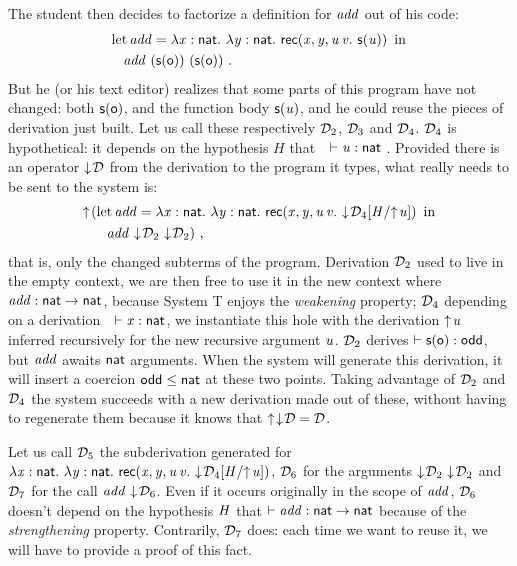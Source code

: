 \documentclass[9pt]{sigplanconf}
\begin{document}
The student then decides to factorize a definition for $\var{add}$ out
of his code:
\begin{align*}
  &\letb{add}{\tlam x {\cst{nat}} \tlam y {\cst{nat}} \recb {\var x}
    {\var y} u v {\s{\var u}}}
  \\
  &\quad\app{\var{add}}\app{(\s\z)}{(\s\z)} \ \text{.}
\end{align*}
But he (or his text editor) realizes that some parts of this program
have not changed: both $\s\z$, and the function body $\s{\var u}$, and
he could reuse the pieces of derivation just built. Let us call these
respectively $\md_2$, $\md_3$ and $\md_4$. $\md_4$ is hypothetical: it
depends on the hypothesis $H$ that\ \ $\vdash \var u:\cst{nat}$ .
Provided there is an operator $\fget\md$ from the derivation to the
program it types, what really needs to be sent to the system is:
\begin{align*}
  &\finfer{}(
    \letb{add}{\tlam x {\cst{nat}} \tlam y {\cst{nat}} \recb {\var x}
      {\var y} u v {\fget{\gsubst{\md_4}{\msubst{H}{\finfer{\var u}}}}}}
    \\&\qquad
    \app{\var{add}}\app{\fget{\md_2}}{\fget{\md_2}}
  )
\ \text{,}
\end{align*}
that is, only the changed subterms of the program. Derivation $\md_2$
used to live in the empty context, we are then free to use it in the
new context where $\var{add}:\cst{nat}\to\cst{nat}$, because System
\sysname T enjoys the \emph{weakening} property; $\md_4$ depending on
a derivation\ \ $\vdash\var x:\cst{nat}$, we instantiate this hole
with the derivation $\finfer{\var u}$ inferred recursively for the new
recursive argument $\var u$. $\md_2$ derives $\vdash \s\z :
\cst{odd}$, but $\var{add}$ awaits $\cst{nat}$ arguments. When the
system will generate this derivation, it will insert a coercion
$\cst{odd} \leq \cst{nat}$ at these two points. Taking advantage of
$\md_2$ and $\md_4$ the system succeeds with a new derivation made out
of these, without having to regenerate them because it knows that
$\finfer{\fget\md} = \md$.

Let us call $\md_5$ the subderivation generated for $\tlam x
{\cst{nat}} \tlam y {\cst{nat}} \recb {\var x} {\var y} u v
{\fget{\gsubst{\md_4}{\msubst H {\finfer{\var u}}}}}$, $\md_6$ for the
arguments $\app{\fget{\md_2}}{\fget{\md_2}}$ and $\md_7$ for the call
$\app{\var{add}} {\fget{\md_6}}$. Even if it occurs originally in the
scope of $\var{add}$, $\md_6$ doesn't depend on the hypothesis $\var
H$ that $\vdash \var{add}:\cst{nat}\to\cst{nat}$ because of the
\emph{strengthening} property. Contrarily, $\md_7$ does: each time we
want to reuse it, we will have to provide a proof of this fact.
\end{document}
